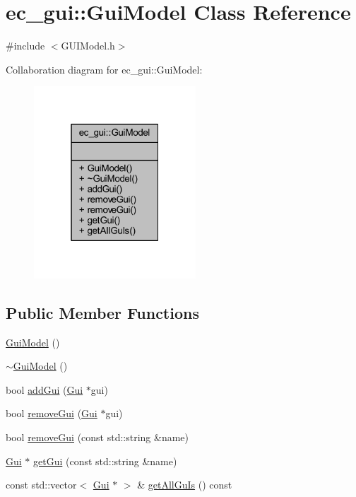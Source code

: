 \hypertarget{classec__gui_1_1_gui_model}{}\section{ec\+\_\+gui\+:\+:Gui\+Model Class Reference}
\label{classec__gui_1_1_gui_model}


{\ttfamily \#include $<$G\+U\+I\+Model.\+h$>$}



Collaboration diagram for ec\+\_\+gui\+:\+:Gui\+Model\+:\nopagebreak
\begin{figure}[H]
\begin{center}
\leavevmode
\includegraphics[width=172pt]{classec__gui_1_1_gui_model__coll__graph}
\end{center}
\end{figure}
\subsection*{Public Member Functions}
\begin{DoxyCompactItemize}
\item 
\mbox{\hyperlink{classec__gui_1_1_gui_model_a1bde335b2021126743ff54efed2c4186}{Gui\+Model}} ()
\item 
\mbox{\hyperlink{classec__gui_1_1_gui_model_a712b4d8c4a6e6ca033a562bf1ec42966}{$\sim$\+Gui\+Model}} ()
\item 
bool \mbox{\hyperlink{classec__gui_1_1_gui_model_ae23d37efac1c89a28dffc06c095fd01f}{add\+Gui}} (\mbox{\hyperlink{classec__gui_1_1_gui}{Gui}} $\ast$gui)
\item 
bool \mbox{\hyperlink{classec__gui_1_1_gui_model_a8b426eba7ff945cb783eb828cc8e35dd}{remove\+Gui}} (\mbox{\hyperlink{classec__gui_1_1_gui}{Gui}} $\ast$gui)
\item 
bool \mbox{\hyperlink{classec__gui_1_1_gui_model_a5fd11ecec934a891542bd1b7538fe258}{remove\+Gui}} (const std\+::string \&name)
\item 
\mbox{\hyperlink{classec__gui_1_1_gui}{Gui}} $\ast$ \mbox{\hyperlink{classec__gui_1_1_gui_model_acdc26c38e830002417fc0ec770b5cef6}{get\+Gui}} (const std\+::string \&name)
\item 
const std\+::vector$<$ \mbox{\hyperlink{classec__gui_1_1_gui}{Gui}} $\ast$ $>$ \& \mbox{\hyperlink{classec__gui_1_1_gui_model_ad36bedb3125a80a1d972064de8d1cb06}{get\+All\+Gu\+Is}} () const
\end{DoxyCompactItemize}


